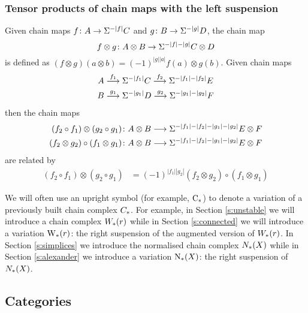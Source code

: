 \subsubsection{Tensor products of chain maps with the left suspension} Given chain maps $f\colon A\to \Sigma^{-|f|}C$ and $g\colon B\to \Sigma^{-|g|}D$, the chain map 
\[
	f\otimes g\colon A\otimes B\to \Sigma^{-|f|-|g|}C\otimes D
\]
is defined as $(f\otimes g)(a\otimes b) = (-1)^{|g||a|} f(a)\otimes g(b)$. Given chain maps 
\begin{align*}
	A & \overset{f_1}{\longrightarrow} \Sigma^{-|f_1|} C \overset{f_2}{\longrightarrow} \Sigma^{-|f_1|-|f_2|} E \\
	B & \overset{g_1}{\longrightarrow} \Sigma^{-|g_1|} D \overset{g_2}{\longrightarrow} \Sigma^{-|g_1|-|g_2|} F \\
\end{align*}
then the chain maps 
\begin{align*}
(f_2\circ f_1)\otimes (g_2\circ g_1)\colon &A\otimes B\longrightarrow \Sigma^{-|f_1|-|f_2|-|g_1|-|g_2|}E\otimes F
\\
(f_2\otimes g_2)\circ (f_1\otimes g_1)\colon &A\otimes B\longrightarrow \Sigma^{-|f_1|-|f_2|-|g_1|-|g_2|}E\otimes F
\end{align*}
 are related by
\begin{align*}
	(f_2\circ f_1)\otimes (g_2\circ g_1) &= (-1)^{|f_1||g_2|}(f_2\otimes g_2)\circ (f_1\otimes g_1)
\end{align*}
\begin{notation}
	We will often use an upright symbol (for example, $\operatorname{C}_{*}$) to denote a variation of a previously built chain complex $C_{*}$. For example, in Section \ref{s:unstable} we will introduce a chain complex $W_{*}(r)$ while in Section \ref{s:connected} we will introduce a variation $\operatorname{W}_{*}(r)$: the right suspension of the augmented version of $W_{*}(r)$. In Section \ref{s:simplices} we introduce the normalised chain complex $N_{*}(X)$ while in Section \ref{s:alexander} we introduce a variation $\operatorname{N}_{*}(X)$: the right suspension of $N_{*}(X)$. 
\end{notation}



\subsection{Categories}\label{s:categories}

